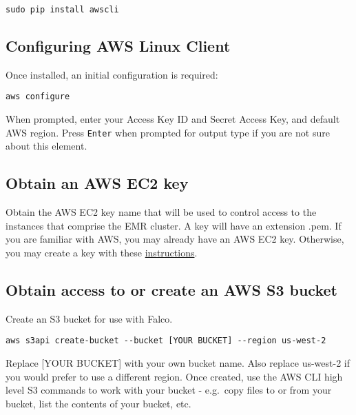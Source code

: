 \documentclass[]{book}
\begin{document}
\begin{verbatim}
sudo pip install awscli
\end{verbatim}

\hypertarget{configuring-aws-linux-client}{%
\subsection{Configuring AWS Linux Client}\label{configuring-aws-linux-client}}

Once installed, an initial configuration is required:

\begin{verbatim}
aws configure
\end{verbatim}

When prompted, enter your Access Key ID and Secret Access Key, and default AWS region. Press \texttt{Enter} when prompted for output type if you are not sure about this element.

\hypertarget{obtain-an-aws-ec2-key}{%
\subsection{Obtain an AWS EC2 key}\label{obtain-an-aws-ec2-key}}

Obtain the AWS EC2 key name that will be used to control access to the instances that comprise the EMR cluster. A key will have an extension .pem. If you are familiar with AWS, you may already have an AWS EC2 key. Otherwise, you may create a key with these \href{https://docs.aws.amazon.com/elasticbeanstalk/latest/dg/create_deploy_NET.quickstart.html\#create-a-key-pair}{instructions}.

\hypertarget{obtain-access-to-or-create-an-aws-s3-bucket}{%
\subsection{Obtain access to or create an AWS S3 bucket}\label{obtain-access-to-or-create-an-aws-s3-bucket}}

Create an S3 bucket for use with Falco.

\begin{verbatim}
aws s3api create-bucket --bucket [YOUR BUCKET] --region us-west-2
\end{verbatim}

Replace {[}YOUR BUCKET{]} with your own bucket name. Also replace us-west-2 if you would prefer to use a different region. Once created, use the AWS CLI high level S3 commands to work with your bucket - e.g.~copy files to or from your bucket, list the contents of your bucket, etc.
\end{document}
